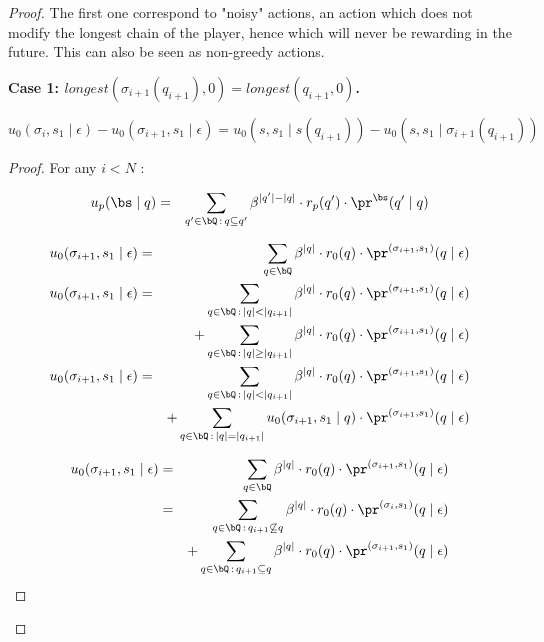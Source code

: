\begin{proof}
\bigskip
The first one correspond to "noisy" actions, an action which does not modify the longest chain of the player, hence which will never be rewarding in the future. This can also be seen as non-greedy actions.

\textbf{Case 1: $longest(\sigma_{i+1}(q_{i+1}),0) = longest(q_{i+1},0)$.}

\begin{mylem}
\label{lemdif}
$u_0(\sigma_i,s_1 \mid \epsilon) - u_0(\sigma_{i+1},s_1 \mid \epsilon) = u_0(s,s_1 \mid s(q_{i+1})) - u_0(s,s_1 \mid \sigma_{i+1}(q_{i+1}))$
\end{mylem}
\begin{proof}
\iffalse
For any $i < N$ :

\begin{eqnarray*}
u_p(\bs \mid q) & = & \sum_{q' \in \bQ \,:\, q \subseteq q'} \beta^{|q'|-|q|} \cdot  r_p(q') \cdot \pr^{\bs}(q' \mid q)
\end{eqnarray*}

\begin{eqnarray*}
u_0(\sigma_{i+1},s_1 \mid \epsilon) & = & \sum_{q \in \bQ} \beta^{|q|} \cdot  r_0(q) \cdot \pr^{(\sigma_{i+1},s_1)}(q \mid \epsilon)\\
u_0(\sigma_{i+1},s_1 \mid \epsilon) & = & \sum_{q \in \bQ \,:\, |q| < |q_{i+1}| } \beta^{|q|} \cdot  r_0(q) \cdot \pr^{(\sigma_{i+1},s_1)}(q \mid \epsilon)\\
& & + \sum_{q \in \bQ \,:\, |q| \geq |q_{i+1}| } \beta^{|q|} \cdot  r_0(q) \cdot \pr^{(\sigma_{i+1},s_1)}(q \mid \epsilon)\\
u_0(\sigma_{i+1},s_1 \mid \epsilon) & = & \sum_{q \in \bQ \,:\, |q| < |q_{i+1}| } \beta^{|q|} \cdot  r_0(q) \cdot \pr^{(\sigma_{i+1},s_1)}(q \mid \epsilon)\\
& & + \sum_{q \in \bQ \,:\, |q| = |q_{i+1}| } u_0(\sigma_{i+1},s_1 \mid q) \cdot \pr^{(\sigma_{i+1},s_1)}(q \mid \epsilon)\\
\end{eqnarray*}

\begin{eqnarray*}
u_0(\sigma_{i+1},s_1 \mid \epsilon) & = & \sum_{q \in \bQ} \beta^{|q|} \cdot  r_0(q) \cdot \pr^{(\sigma_{i+1},s_1)}(q \mid \epsilon)\\
& = & \sum_{q \in \bQ \,:\, q_{i+1} \not \subseteq q} \beta^{|q|} \cdot  r_0(q) \cdot \pr^{(\sigma_{i},s_1)}(q \mid \epsilon) \\
&  & +  \sum_{q \in \bQ \,:\, q_{i+1} \subseteq q} \beta^{|q|} \cdot  r_0(q) \cdot \pr^{(\sigma_{i+1},s_1)}(q \mid \epsilon) \\
\end{eqnarray*}


\end{proof}
\end{proof}
